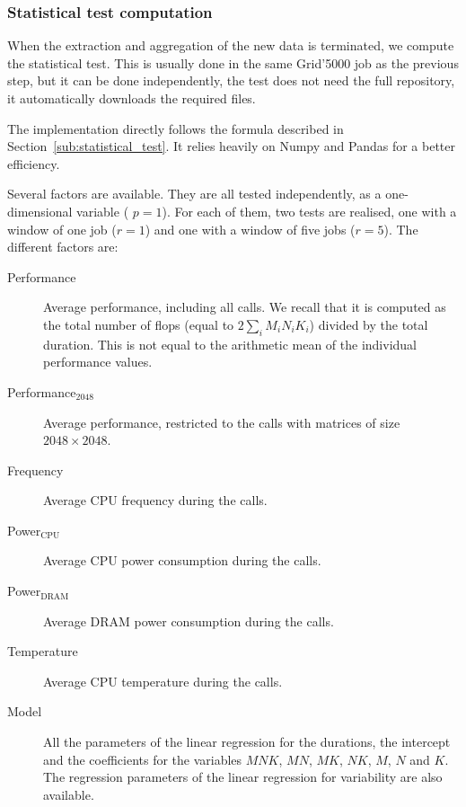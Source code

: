             \subsubsection{Statistical test computation}%

                When the extraction and aggregation of the new data is terminated, we compute the statistical test. This
                is usually done in the same Grid'5000 job as the previous step, but it can be done independently, the
                test does not need the full repository, it automatically downloads the required files.

                The implementation directly follows the formula described in Section~\ref{sub:statistical_test}. It
                relies heavily on Numpy and Pandas for a better efficiency.

                Several factors are available. They are all tested independently, as a one-dimensional variable (\ie
                \(p=1\)). For each of them, two tests are realised, one with a window of one job (\ie \(r=1\)) and one
                with a window of five jobs (\ie \(r=5\)). The different factors are:
                \begin{description}
                    \item[Performance] Average \dgemm performance, including all calls. We recall that it is computed as
                        the total number of flops (equal to \(2\sum_i M_iN_iK_i\)) divided by the total duration. This
                        is not equal to the arithmetic mean of the individual performance values.
                    \item[Performance$_{\text{2048}}$] Average \dgemm performance, restricted to the calls with matrices
                        of size \(2048\times2048\).
                    \item[Frequency] Average CPU frequency during the \dgemm calls.
                    \item[Power$_{\text{CPU}}$] Average CPU power consumption during the \dgemm calls.
                    \item[Power$_{\text{DRAM}}$] Average DRAM power consumption during the \dgemm calls.
                    \item[Temperature] Average CPU temperature during the \dgemm calls.
                    \item[Model] All the parameters of the linear regression for the \dgemm durations, \ie the intercept
                        and the coefficients for the variables \(MNK\), \(MN\), \(MK\), \(NK\), \(M\), \(N\) and \(K\).
                        The regression parameters of the linear regression for \dgemm variability are also available.
                \end{description}

